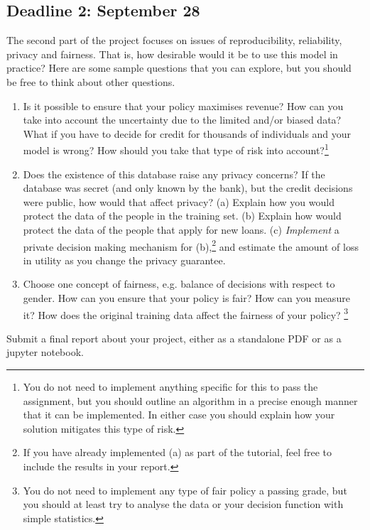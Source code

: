 \subsection{Deadline 2: September 28}
The second part of the project focuses on issues of reproducibility, reliability, privacy and fairness. That is, how desirable would it be to use this model in practice? Here are some sample questions that you can explore, but you should be free to think about other questions.
\begin{enumerate}
\item Is it possible to ensure that your policy maximises revenue? How can you take into account the uncertainty due to the limited and/or biased data? What if you have to decide for credit for thousands of individuals and your model is wrong? How should you take that type of risk into account?\footnote{You do not need to implement anything specific for this to pass the assignment, but you should outline an algorithm in a precise enough manner that it can be implemented. In either case you should explain how your solution mitigates this type of risk.}
\item Does the existence of this database raise any privacy concerns? If the database was secret (and only known by the bank), but the credit decisions were public, how would that affect privacy? (a) Explain how you would protect the data of the people in the training set. (b) Explain how would protect the data of the people that apply for new loans. (c) \emph{Implement} a private decision making mechanism for (b),\footnote{If you have already implemented (a) as part of the tutorial, feel free to include the results in your report.} and estimate the amount of loss in utility as you change the privacy guarantee.
\item Choose one concept of fairness, e.g. balance of decisions with respect to gender. How can you ensure that your policy is fair? How can you measure it? How does the original training data affect the fairness of your policy? \footnote{You do not need to implement any type of fair policy a passing grade, but you should at least try to analyse the data or your decision function with simple statistics.}
\end{enumerate}

Submit a final report about your project, either as a standalone PDF or as a jupyter notebook.


